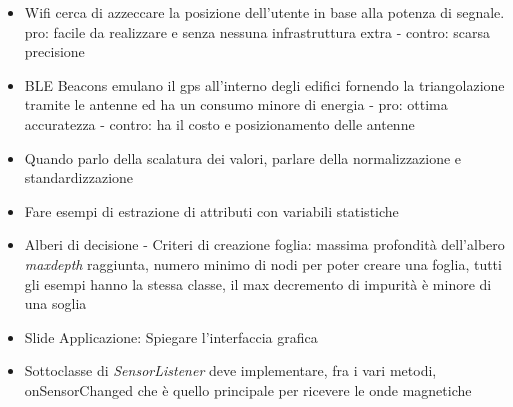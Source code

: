 \documentclass[10pt,a4paper]{article}
\begin{document}
	\begin{itemize}
		\item Wifi cerca di azzeccare la posizione dell'utente in base alla potenza di segnale. pro: facile da realizzare e senza nessuna infrastruttura extra - contro: scarsa precisione
		\item BLE Beacons emulano il gps all'interno degli edifici fornendo la triangolazione tramite le antenne ed ha un consumo minore di energia - pro: ottima accuratezza - contro: ha il costo e posizionamento delle antenne
		\item Quando parlo della scalatura dei valori, parlare della normalizzazione e standardizzazione
		\item Fare esempi di estrazione di attributi con variabili statistiche
		\item Alberi di decisione - Criteri di creazione foglia: massima profondit\`a dell'albero \textit{maxdepth} raggiunta, numero minimo di nodi per poter creare una foglia, tutti gli esempi hanno la stessa classe, il max decremento di impurit\`a \`e minore di una soglia
		\item Slide Applicazione: Spiegare l'interfaccia grafica
		\item Sottoclasse di \textit{SensorListener} deve implementare, fra i vari metodi, onSensorChanged che \`e quello principale per ricevere le onde magnetiche
	\end{itemize}
\end{document}
